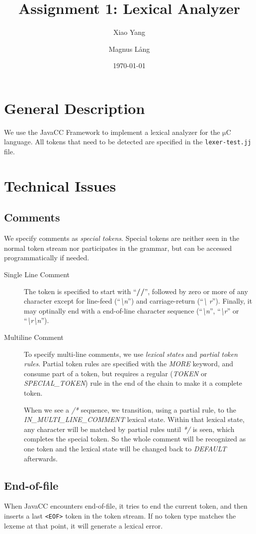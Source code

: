 \documentclass[a4paper,11pt]{article}
\title{Assignment 1: Lexical Analyzer}
\author{Xiao Yang \and Magnus L{\aa}ng} %
\date{\today}
\newcommand{\token}[1]{\texttt{<#1>}}
\newcommand{\uC}{{$\mathrm{\mu}$}C }
\begin{document}
\maketitle
\section{General Description}
We use the JavaCC Framework to implement a lexical analyzer for the \uC
language. All tokens that need to be detected are specified in the
\texttt{lexer-test.jj} file.

\section{Technical Issues}
\subsection{Comments}
We specify comments as \emph{special tokens}. Special tokens are neither seen in
the normal token stream nor participates in the grammar, but can be accessed
programmatically if needed.
\begin{description}
\item[Single Line Comment] The token is specified to start with ``\textbf{//}'',
  followed by zero or more of any character except for line-feed
  (``\textit{\textbackslash n}'') and carriage-return (``\textit{\textbackslash
    r}''). Finally, it may optinally end with a end-of-line character sequence
  (``\textit{\textbackslash n}'', ``\textit{\textbackslash r}'' or
  ``\textit{\textbackslash r\textbackslash n}'').
\item[Multiline Comment] To specify multi-line comments, we use \emph{lexical
    states} and \emph{partial token rules}. Partial token rules are specified
  with the \emph{MORE} keyword, and consume part of a token, but requires a
  regular (\emph{TOKEN} or \emph{SPECIAL\_TOKEN}) rule in the end of the chain
  to make it a complete token.

  When we see a \textit{/*} sequence, we transition, using a partial rule, to
  the \emph{IN\_MULTI\_LINE\_COMMENT} lexical state. Within that lexical state,
  any character will be matched by partial rules until \textit{*/} is seen,
  which completes the special token. So the whole comment will be recognized as
  one token and the lexical state will be changed back to \emph{DEFAULT}
  afterwards.

\end{description}
\subsection{End-of-file}
When JavaCC encounters end-of-file, it tries to end the current token, and then
inserts a last \token{EOF} token in the token stream. If no token type matches
the lexeme at that point, it will generate a lexical error.
\end{document}
